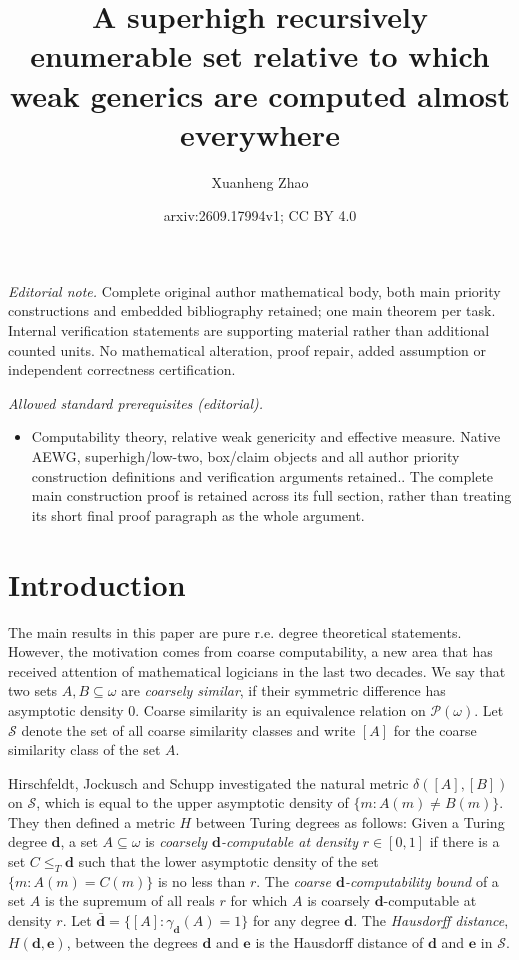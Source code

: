 \documentclass[10pt,a4paper]{amsart}
\title{A superhigh recursively enumerable set relative to which weak generics are computed almost everywhere}
\author{Xuanheng Zhao}
\date{arxiv:2609.17994v1; CC BY 4.0}
\begin{document}
\maketitle
\noindent\textit{Editorial note.} Complete original author mathematical body, both main priority constructions and embedded bibliography retained; one main theorem per task. Internal verification statements are supporting material rather than additional counted units. No mathematical alteration, proof repair, added assumption or independent correctness certification.\par\medskip
\noindent\textit{Allowed standard prerequisites (editorial).}\begin{itemize}
\item Computability theory, relative weak genericity and effective measure. Native AEWG, superhigh/low-two, box/claim objects and all author priority construction definitions and verification arguments retained.. The complete main construction proof is retained across its full section, rather than treating its short final proof paragraph as the whole argument.
\end{itemize}\medskip
\section{Introduction}

The main results in this paper are pure r.e. degree theoretical statements.
However, the motivation comes from coarse computability, a new area that has
received attention of mathematical logicians in the last two decades.
We say that two sets $A, B \subseteq \omega$ are {\emph{coarsely similar}}, if their symmetric difference has asymptotic density 0. Coarse similarity is an equivalence relation on $\mathcal{P} (\omega)$.
Let $\mathcal{S}$ denote the set of all coarse similarity classes and write
$[A]$ for the coarse similarity class of the set $A$. 

Hirschfeldt, Jockusch
and Schupp {\cite{MR4741732}} investigated the natural metric $\delta ([A], [B])$ on $\mathcal{S}$, which is equal to the upper asymptotic density of $\{ m: A (m)
   \neq B (m) \}$. They then defined a metric $H$
between Turing degrees as follows:
Given a Turing degree $\mathbf{d}$, a set $A \subseteq \omega$ is
{\emph{coarsely $\mathbf{d}$-computable at density}} $r \in [0, 1]$ if there
is a set $C \leq_T \mathbf{d}$ such that the lower asymptotic density of the set $\{m:A(m)=C(m)\}$ is no less than $r$.
The {\emph{coarse $\mathbf{d}$-computability bound}} of a set $A$ is
 the supremum of all reals $r$ for which $A$ is coarsely $\mathbf{d}$-computable at density $r$.
Let $\bar{\mathbf{d}} = \{ [A] : \gamma_{\mathbf{d}} (A) = 1 \}$ for any
degree $\mathbf{d}$. The {\emph{Hausdorff distance}}, $H (\mathbf{d}, \mathbf{e})$,
between the degrees $\mathbf{d}$ and $\mathbf{e}$ is the Hausdorff distance of $\mathbf{d}$ and $\mathbf{e}$ in $\mathcal{S}$.
\end{document}

